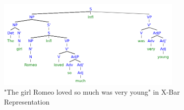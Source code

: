 \documentclass[a4paper]{article}
\begin{document}
	\begin{figure}[htpb]
		\centering
		\includegraphics[width=0.8\textwidth]{ii_xbar}
		\caption{"The girl Romeo loved so much was very young"
		in X-Bar Representation}
		\label{fig:ii_xbar}
	\end{figure}
\end{document}
